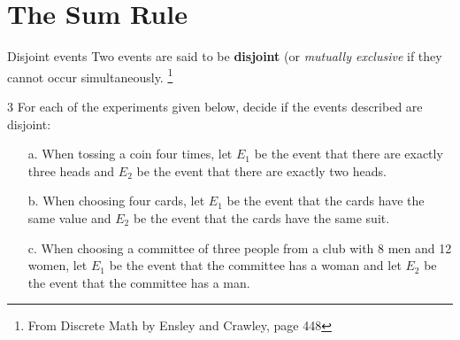 \documentclass[a4paper,12pt]{book}
\title{}
\author{Rachel Morris}
\date{\today}
\newcounter{question}
\begin{document}
    \togglefalse{answerkey}

    \section{The Sum Rule}

        \begin{intro}{Disjoint events}
            Two events are said to be \textbf{disjoint} (or \textit{mutually exclusive}
            if they cannot occur simultaneously.
            \footnote{From Discrete Math by Ensley and Crawley, page 448}
        \end{intro}
        
        
        \begin{question}{\thequestion}{3}
        	For each of the experiments given below, decide if the
				events described are disjoint:
				
				\begin{itemize}
					\item[a.]	When tossing a coin four times, let $E_1$ be the
					event that there are exactly three heads and $E_2$ be the event
					that there are exactly two heads. ~\\
					
					\item[b.]	When choosing four cards, let $E_1$ be the event that
					the cards have the same value and $E_2$ be the event that the cards
					have the same suit. ~\\
					
					\item[c.] When choosing a committee of three people from a
					club with 8 men and 12 women, let $E_1$ be the event that the committee
					has a woman and let $E_2$ be the event that the committee has a man. ~\\
				\end{itemize}
        \end{question}
        
\end{document}
